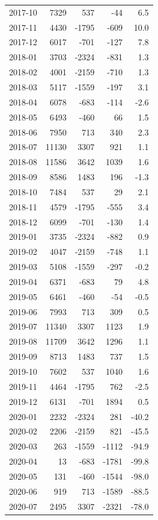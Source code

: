 \begin{longtable}{lrrrr}
2017-10 & 7329 & 537 & -44 & 6.5 \\
2017-11 & 4430 & -1795 & -609 & 10.0 \\
2017-12 & 6017 & -701 & -127 & 7.8 \\
2018-01 & 3703 & -2324 & -831 & 1.3 \\
2018-02 & 4001 & -2159 & -710 & 1.3 \\
2018-03 & 5117 & -1559 & -197 & 3.1 \\
2018-04 & 6078 & -683 & -114 & -2.6 \\
2018-05 & 6493 & -460 & 66 & 1.5 \\
2018-06 & 7950 & 713 & 340 & 2.3 \\
2018-07 & 11130 & 3307 & 921 & 1.1 \\
2018-08 & 11586 & 3642 & 1039 & 1.6 \\
2018-09 & 8586 & 1483 & 196 & -1.3 \\
2018-10 & 7484 & 537 & 29 & 2.1 \\
2018-11 & 4579 & -1795 & -555 & 3.4 \\
2018-12 & 6099 & -701 & -130 & 1.4 \\
2019-01 & 3735 & -2324 & -882 & 0.9 \\
2019-02 & 4047 & -2159 & -748 & 1.1 \\
2019-03 & 5108 & -1559 & -297 & -0.2 \\
2019-04 & 6371 & -683 & 79 & 4.8 \\
2019-05 & 6461 & -460 & -54 & -0.5 \\
2019-06 & 7993 & 713 & 309 & 0.5 \\
2019-07 & 11340 & 3307 & 1123 & 1.9 \\
2019-08 & 11709 & 3642 & 1296 & 1.1 \\
2019-09 & 8713 & 1483 & 737 & 1.5 \\
2019-10 & 7602 & 537 & 1040 & 1.6 \\
2019-11 & 4464 & -1795 & 762 & -2.5 \\
2019-12 & 6131 & -701 & 1894 & 0.5 \\
2020-01 & 2232 & -2324 & 281 & -40.2 \\
2020-02 & 2206 & -2159 & 821 & -45.5 \\
2020-03 & 263 & -1559 & -1112 & -94.9 \\
2020-04 & 13 & -683 & -1781 & -99.8 \\
2020-05 & 131 & -460 & -1544 & -98.0 \\
2020-06 & 919 & 713 & -1589 & -88.5 \\
2020-07 & 2495 & 3307 & -2321 & -78.0 \\

\end{longtable}
